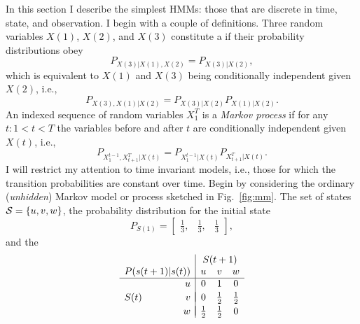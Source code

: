 \documentclass[]{article}
\newcommand{\ts}[3]{#1_{#2}^{#3}}                    %
\newcommand{\ti}[2]{{#1}{(#2)}}                  %
\newcommand{\states}{{\cal{S}}}
\newcommand{\ie}{i.e.\xspace}
\begin{document}
In this section I describe the simplest HMMs: those that are
discrete in time, state, and observation.  I begin with a couple of
definitions.  Three random variables $\ti{X}{1}$, $\ti{X}{2}$, and
$\ti{X}{3}$ constitute a \emph{} if their
probability distributions obey
\begin{equation}
  \label{eq:MarkovChain}
  P_{\ti{X}{3}|\ti{X}{1},\ti{X}{2}} = P_{\ti{X}{3}|\ti{X}{2}},
\end{equation}
which is equivalent to $\ti{X}{1}$ and $\ti{X}{3}$ being conditionally
independent given $\ti{X}{2}$, \ie,
\begin{equation*}
  P_{\ti{X}{3},\ti{X}{1}|\ti{X}{2}} = P_{\ti{X}{3}|\ti{X}{2}}   P_{\ti{X}{1}|\ti{X}{2}}.
\end{equation*}
An indexed sequence of random variables $\ts{X}{1}{T}$ is a
\emph{Markov process} if for any $t: 1 < t < T$
the variables before and after $t$ are conditionally independent given
$\ti{X}{t}$, \ie,
\begin{equation}
  \label{eq:MarkovProcess}
  P_{\ts{X}{1}{t-1},\ts{X}{t+1}{T}|\ti{X}{t}} =
  P_{\ts{X}{1}{t-1}|\ti{X}{t}} P_{\ts{X}{t+1}{T}|\ti{X}{t}}.
\end{equation}
I will restrict my attention to time invariant models, \ie, those
for which the transition probabilities are constant over time.
Begin by considering the ordinary (\emph{unhidden})
Markov model or process sketched in Fig.~\ref{fig:mm}.  The set of
states $\states = \left\{u,v,w\right\}$, the probability distribution
for the initial state
\begin{equation}
  \label{eq:InitialProbabilites}
P_{\ti{S}{1}} =
\begin{bmatrix}
  \frac{1}{3}, & \frac{1}{3}, & \frac{1}{3}
\end{bmatrix},
\end{equation}
and the~%
\begin{equation}
  \label{eq:TransitionMatrix}
\begin{array}{rr|ccc}
  && \multicolumn{3}{c}{\ti{S}{t+1}} \\
  \multicolumn{2}{c|}{P(\ti{s}{t+1}|\ti{s}{t})} & u & v & w \\ \hline
  & u & 0 & 1 & 0 \\  && \vspace{-1 em} \\
  \ti{S}{t} & v & 0 & \frac{1}{2} & \frac{1}{2} \\  && \vspace{-0.98 em} \\
  & w & \frac{1}{2} & \frac{1}{2} & 0
\end{array}
\end{equation}
\end{document}
